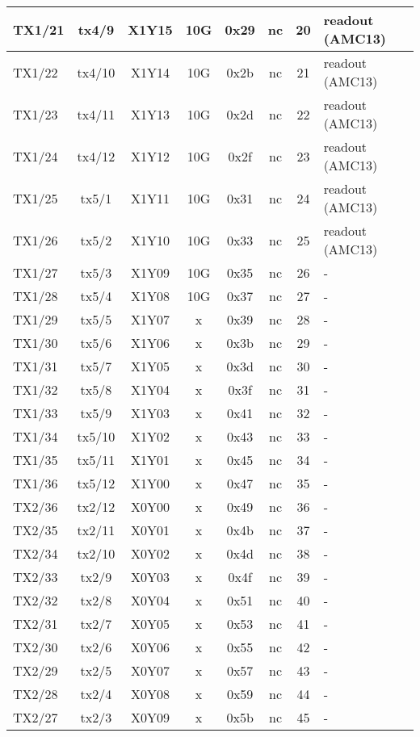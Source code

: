 \begin{longtable}{|l|c|c|c|c|c|c|l|}
TX1/21 & tx4/9  & X1Y15 & 10G & 0x29 & nc & 20 & readout (AMC13)\\\hline
TX1/22 & tx4/10 & X1Y14 & 10G & 0x2b & nc & 21 & readout (AMC13)\\\hline
TX1/23 & tx4/11 & X1Y13 & 10G & 0x2d & nc & 22 & readout (AMC13)\\\hline
TX1/24 & tx4/12 & X1Y12 & 10G & 0x2f & nc & 23 & readout (AMC13)\\\hline
TX1/25 & tx5/1  & X1Y11 & 10G & 0x31 & nc & 24 & readout (AMC13)\\\hline
TX1/26 & tx5/2  & X1Y10 & 10G & 0x33 & nc & 25 & readout (AMC13)\\\hline
TX1/27 & tx5/3  & X1Y09 & 10G & 0x35 & nc & 26 & -\\\hline
TX1/28 & tx5/4  & X1Y08 & 10G & 0x37 & nc & 27 & -\\\hline
TX1/29 & tx5/5  & X1Y07 &  x   & 0x39 & nc & 28 & -\\\hline
TX1/30 & tx5/6  & X1Y06 &  x   & 0x3b & nc & 29 & -\\\hline
TX1/31 & tx5/7  & X1Y05 &  x   & 0x3d & nc & 30 & -\\\hline
TX1/32 & tx5/8  & X1Y04 &  x   & 0x3f & nc & 31 & -\\\hline
TX1/33 & tx5/9  & X1Y03 &  x   & 0x41 & nc & 32 & -\\\hline
TX1/34 & tx5/10 & X1Y02 &  x   & 0x43 & nc & 33 & -\\\hline
TX1/35 & tx5/11 & X1Y01 &  x   & 0x45 & nc & 34 & -\\\hline
TX1/36 & tx5/12 & X1Y00 &  x   & 0x47 & nc & 35 & -\\\hline
TX2/36 & tx2/12 & X0Y00 &  x   & 0x49 & nc & 36 & -\\\hline
TX2/35 & tx2/11 & X0Y01 &  x   & 0x4b & nc & 37 & -\\\hline
TX2/34 & tx2/10 & X0Y02 &  x   & 0x4d & nc & 38 & -\\\hline
TX2/33 & tx2/9  & X0Y03 &  x   & 0x4f & nc & 39 & -\\\hline
TX2/32 & tx2/8  & X0Y04 &  x   & 0x51 & nc & 40 & -\\\hline
TX2/31 & tx2/7  & X0Y05 &  x   & 0x53 & nc & 41 & -\\\hline
TX2/30 & tx2/6  & X0Y06 &  x   & 0x55 & nc & 42 & -\\\hline
TX2/29 & tx2/5  & X0Y07 &  x   & 0x57 & nc & 43 & -\\\hline
TX2/28 & tx2/4  & X0Y08 &  x   & 0x59 & nc & 44 & -\\\hline
TX2/27 & tx2/3  & X0Y09 &  x   & 0x5b & nc & 45 & -\\\hline

\end{longtable}
